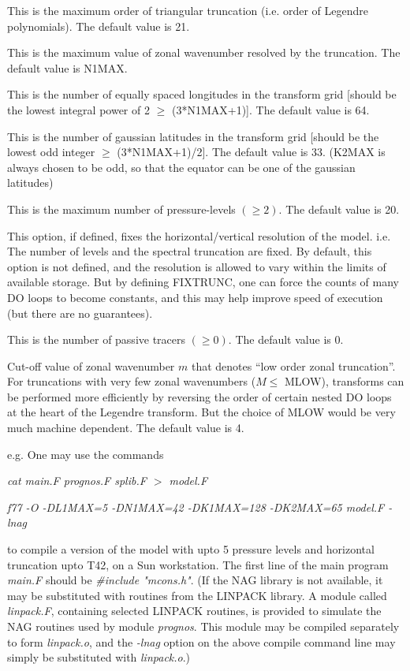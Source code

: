 This is the maximum order of triangular truncation (i.e. order
of Legendre polynomials). The default value is 21.
 
 This is the maximum value of zonal wavenumber resolved by the
truncation. The default value is N1MAX.
 
 This is the number of equally spaced longitudes in the
transform grid [should be the lowest integral power of 2 $\ge$ (3*N1MAX+1)].
The default value is 64.
 
 This is the number of gaussian latitudes in the transform grid
[should be the lowest odd integer $\ge$ (3*N1MAX+1)/2]. The default value is
33. (K2MAX is always chosen to be odd, so that the equator can be one of the
gaussian latitudes)
 
 
 This is the maximum number of pressure-levels $(\ge2)$. The
default value is 20.
 
 This option, if defined, fixes the horizontal/vertical
resolution of the model. i.e. The number of levels and the spectral truncation
are fixed. By default, this option is not defined, and the resolution is
allowed to vary within the limits of available storage. But by defining
FIXTRUNC, one can force the counts of many DO loops to become constants, and
this may help improve speed of execution (but there are no guarantees).
 
 This is the number of passive tracers $(\ge0)$. The default
value is 0.
 
 Cut-off value of zonal wavenumber $m$ that denotes ``low order
zonal truncation''. For truncations with very few zonal wavenumbers ($M \le$
MLOW), transforms can be performed more efficiently by reversing the order of
certain nested DO loops at the heart of the Legendre transform. But the choice
of MLOW would be very much machine dependent. The default value is 4.
 
\noindent e.g. One may use the commands
 
{\sl cat main.F prognos.F splib.F $>$ model.F}
 
{\sl f77 -O -DL1MAX=5 -DN1MAX=42 -DK1MAX=128 -DK2MAX=65 model.F -lnag}
 
to compile a version of the model with upto 5 pressure levels and horizontal
truncation upto T42, on a Sun workstation. The first line of the main program
{\sl main.F} should be {\sl \#include "mcons.h"}. (If the NAG library is not
available, it may be substituted with routines from the LINPACK library. A
module called {\sl linpack.F}, containing selected LINPACK routines, is
provided to simulate the NAG routines used by module {\sl prognos}. This
module may be compiled separately to form {\sl linpack.o}, and the {\sl -lnag}
option on the above compile command line may simply be substituted with {\sl
linpack.o}.)
 
